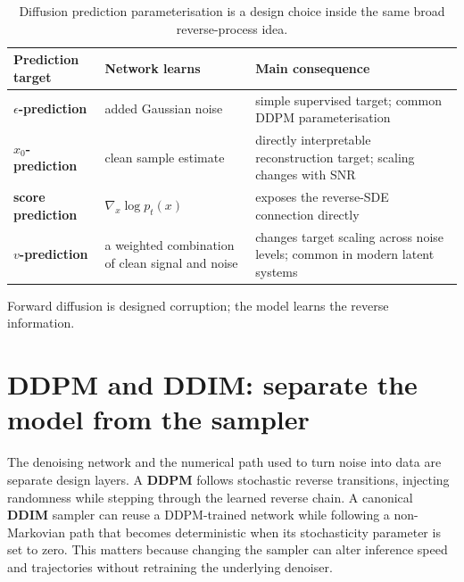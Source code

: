 \begin{table}[H]
\centering
\small
\begin{tabularx}{\linewidth}{>{\bfseries}l X X}
\toprule
Prediction target & Network learns & Main consequence \\
\midrule
$\epsilon$-prediction & added Gaussian noise & simple supervised target; common DDPM parameterisation \\
$x_0$-prediction & clean sample estimate & directly interpretable reconstruction target; scaling changes with SNR \\
score prediction & $\nabla_x\log p_t(x)$ & exposes the reverse-SDE connection directly \\
$v$-prediction & a weighted combination of clean signal and noise & changes target scaling across noise levels; common in modern latent systems \\
\bottomrule
\end{tabularx}
\caption{Diffusion prediction parameterisation is a design choice inside the same broad reverse-process idea.}
\label{tab:diffusion-targets}
\end{table}

\begin{calloutmemoryhook}
Forward diffusion is designed corruption; the model learns the reverse information.
\end{calloutmemoryhook}

\section{DDPM and DDIM: separate the model from the sampler}

The denoising network and the numerical path used to turn noise into data are separate design layers.
A \textbf{DDPM} follows stochastic reverse transitions, injecting randomness while stepping through the learned reverse chain.
A canonical \textbf{DDIM} sampler can reuse a DDPM-trained network while following a non-Markovian path that becomes deterministic when its stochasticity parameter is set to zero.
This matters because changing the sampler can alter inference speed and trajectories without retraining the underlying denoiser.

